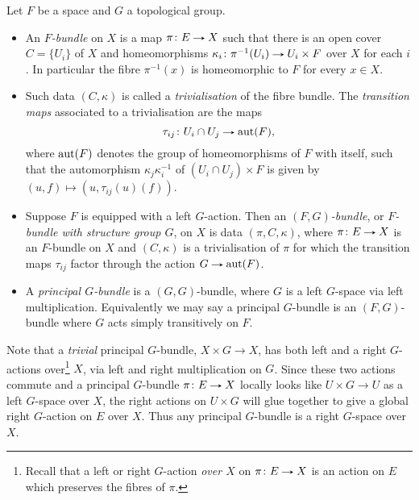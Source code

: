 \begin{definitions}
  \label{fibre-bundle}
  Let $F$ be a space and $G$ a topological group.
  \begin{itemize}
  \item An \emph{$F$-bundle} on $X$ is a map $\pi \c E \to X$ such
    that there is an open cover $C = \{U_i\}$ of $X$ and
    homeomorphisms $\kappa_i \c \pi^{-1}(U_i) \to U_i \times F$ over
    $X$ for each $i$. In particular the fibre $\pi^{-1}(x)$ is
    homeomorphic to $F$ for every $x \in X$.
  \item Such data $(C,\kappa)$ is called a \emph{trivialisation} of
    the fibre bundle. The \emph{transition maps} associated to a
    trivialisation are the maps
    \[
    \tau_{ij} \c U_i \cap U_j \to \aut(F),
    \]
    where $\operatorname{aut}(F)$ denotes the group of homeomorphisms of $F$ with
    itself, such that the automorphism $\kappa_j\kappa_i^{-1}$ of
    $(U_i \cap U_j) \times F$ is given by $(u,f) \mapsto (u,
    \tau_{ij}(u)(f))$.
  \item Suppose $F$ is equipped with a left $G$-action. Then an
    \emph{$(F,G)$-bundle}, or \emph{$F$-bundle with structure group
      $G$}, on $X$ is data $(\pi,C,\kappa)$, where $\pi \c E \to X$ is
    an $F$-bundle on $X$ and $(C,\kappa)$ is a trivialisation of $\pi$
    for which the transition maps $\tau_{ij}$ factor through the
    action $G \to \aut(F)$.
  \item A \emph{principal $G$-bundle} is a $(G,G)$-bundle, where $G$
    is a left $G$-space via left multiplication. Equivalently we may
    say a principal $G$-bundle is an $(F,G)$-bundle where $G$ acts
    simply transitively on $F$.
  \end{itemize}
\end{definitions}

\begin{remark}
  \label{principal-right-action}
  Note that a \emph{trivial} principal $G$-bundle, $X \times G \to X$,
  has both left and a right $G$-actions over\footnote{Recall that a
    left or right $G$-action \emph{over $X$} on $\pi \c E \to X$ is an
    action on $E$ which preserves the fibres of $\pi$.} $X$, via left
  and right multiplication on $G$.  Since these two actions commute
  and a principal $G$-bundle $\pi \c E \to X$ locally looks like $U
  \times G \to U$ as a left $G$-space over $X$, the right actions on
  $U \times G$ will glue together to give a global right $G$-action on
  $E$ over $X$. Thus any principal $G$-bundle is a right $G$-space
  over $X$.
\end{remark}

